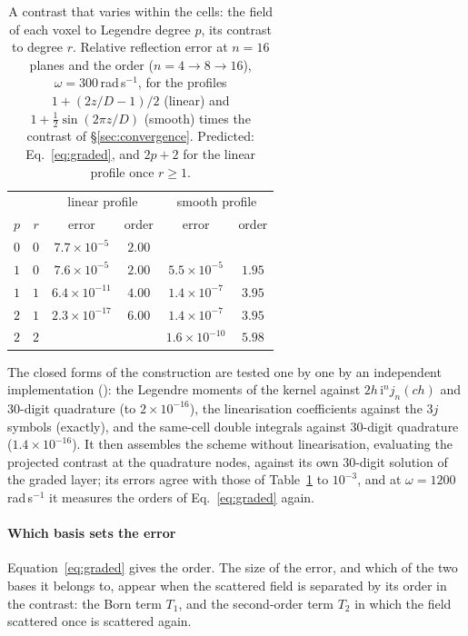 \documentclass[preprint,review,12pt]{elsarticle}
\begin{document}
\begin{table}[htbp]
\centering
\caption{A contrast that varies within the cells: the field of each voxel to Legendre degree $p$, its
contrast to degree $r$. Relative reflection error at $n=16$ planes and the order ($n=4\to8\to16$),
$\omega=300$\,rad\,s$^{-1}$, for the profiles $1+(2z/D-1)/2$ (linear) and $1+\tfrac12\sin(2\pi z/D)$
(smooth) times the contrast of \S\ref{sec:convergence}. Predicted: Eq.~\eqref{eq:graded}, and $2p+2$
for the linear profile once $r\ge1$.}\label{tab:graded}
\small
\begin{tabular}{@{}cccccc@{}}
\toprule
 & & \multicolumn{2}{c}{linear profile} & \multicolumn{2}{c}{smooth profile} \\
$p$ & $r$ & error & order & error & order \\
\midrule
$0$ & $0$ & $7.7\times10^{-5}$ & $2.00$ & & \\
$1$ & $0$ & $7.6\times10^{-5}$ & $2.00$ & $5.5\times10^{-5}$ & $1.95$ \\
$1$ & $1$ & $6.4\times10^{-11}$ & $4.00$ & $1.4\times10^{-7}$ & $3.95$ \\
$2$ & $1$ & $2.3\times10^{-17}$ & $6.00$ & $1.4\times10^{-7}$ & $3.95$ \\
$2$ & $2$ & & & $1.6\times10^{-10}$ & $5.98$ \\
\bottomrule
\end{tabular}
\end{table}
The closed forms of the construction are tested one by one by an independent implementation
(): the Legendre moments of the kernel against
$2h\,\mathrm{i}^nj_n(ch)$ and 30-digit quadrature (to $2\times10^{-16}$), the linearisation
coefficients against the $3j$ symbols (exactly), and the same-cell double integrals against 30-digit
quadrature ($1.4\times10^{-16}$). It then assembles the scheme without linearisation, evaluating the
projected contrast at the quadrature nodes, against its own 30-digit solution of the graded layer; its
errors agree with those of Table~\ref{tab:graded} to $10^{-3}$, and at $\omega=1200$\,rad\,s$^{-1}$ it
measures the orders of Eq.~\eqref{eq:graded} again.

\paragraph{Which basis sets the error} Equation~\eqref{eq:graded} gives the order. The size of the
error, and which of the two bases it belongs to, appear when the scattered field is separated by its
order in the contrast: the Born term $T_1$, and the second-order term $T_2$ in which the field
scattered once is scattered again.
\end{document}
